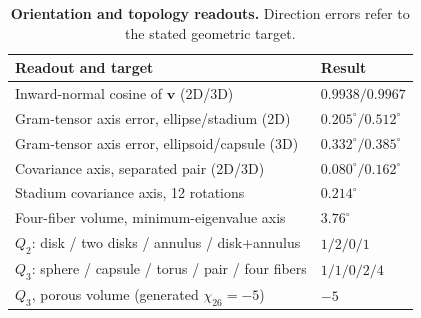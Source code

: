 \documentclass[11pt,a4paper]{article}
\newcommand{\vv}{\bm v}
\begin{document}
\begin{table}[t]
\centering\caption{\textbf{Orientation and topology readouts.} Direction errors refer to the stated geometric target.}\label{tab:orient}
\small\begin{tabularx}{\linewidth}{@{}p{.55\linewidth}X@{}}\toprule
Readout and target & Result\\\midrule
Inward-normal cosine of $\vv$ (2D/3D) & $0.9938/0.9967$\\
Gram-tensor axis error, ellipse/stadium (2D) & $0.205^\circ/0.512^\circ$\\
Gram-tensor axis error, ellipsoid/capsule (3D) & $0.332^\circ/0.385^\circ$\\
Covariance axis, separated pair (2D/3D) & $0.080^\circ/0.162^\circ$\\
Stadium covariance axis, 12 rotations & $0.214^\circ$\\
Four-fiber volume, minimum-eigenvalue axis & $3.76^\circ$\\
$Q_2$: disk / two disks / annulus / disk+annulus & $1/2/0/1$\\
$Q_3$: sphere / capsule / torus / pair / four fibers & $1/1/0/2/4$\\
$Q_3$, porous volume (generated $\chi_{26}=-5$) & $-5$\\\bottomrule
\end{tabularx}
\end{table}
\end{document}
